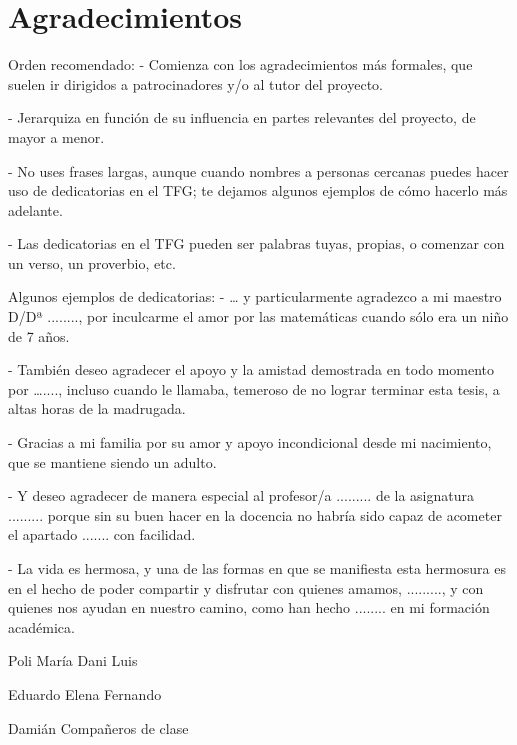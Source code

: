 \chapter*{Agradecimientos}
\pagestyle{empty}

\lettrine[lraise=-0.1, lines=2, loversize=0.25]{}{}


Orden recomendado:
- Comienza con los agradecimientos más formales, que suelen ir dirigidos a patrocinadores y/o al tutor del proyecto.

- Jerarquiza en función de su influencia en partes relevantes del proyecto, de mayor a menor.

- No uses frases largas, aunque cuando nombres a personas cercanas puedes hacer uso de dedicatorias en el TFG; te dejamos algunos ejemplos de cómo hacerlo más adelante.

- Las dedicatorias en el TFG pueden ser palabras tuyas, propias, o comenzar con un verso, un proverbio, etc.

Algunos ejemplos de dedicatorias:
- … y particularmente agradezco a mi maestro D/Dª ........, por inculcarme el amor por las matemáticas cuando sólo era un niño de 7 años.

- También deseo agradecer el apoyo y la amistad demostrada en todo momento por …...., incluso cuando le llamaba, temeroso de no lograr terminar esta tesis, a altas horas de la madrugada.

- Gracias a mi familia por su amor y apoyo incondicional desde mi nacimiento, que se mantiene siendo un adulto.

- Y deseo agradecer de manera especial al profesor/a ......... de la asignatura ......... porque sin su buen hacer en la docencia no habría sido capaz de acometer el apartado ....... con facilidad.

- La vida es hermosa, y una de las formas en que se manifiesta esta hermosura es en el hecho de poder compartir y disfrutar con quienes amamos, ........., y con quienes nos ayudan en nuestro camino, como han hecho ........ en mi formación académica.

Poli
María
Dani
Luis

Eduardo
Elena
Fernando

Damián
Compañeros de clase

